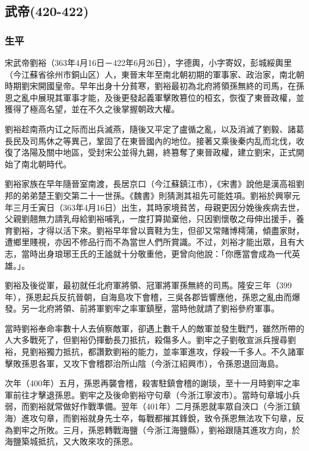 
\subsection{武帝\tiny(420-422)}

\subsubsection{生平}

宋武帝劉裕（363年4月16日－422年6月26日），字德輿，小字寄奴，彭城綏輿里（今江蘇省徐州市銅山区）人，東晉末年至南北朝初期的軍事家、政治家，南北朝時期劉宋開國皇帝。早年出身十分貧寒，劉裕最初為北府將領孫無終的司馬，在孫恩之亂中展現其軍事才能，及後更發起義軍擊敗篡位的桓玄，恢復了東晉政權，並獲得了極高名望，並在不久之後掌握朝政大權。

劉裕趁南燕内讧之际而出兵滅燕，隨後又平定了盧循之亂，以及消滅了劉毅、諸葛長民及司馬休之等異己，鞏固了在東晉國內的地位。接著又乘後秦内乱而北伐，收復了洛陽及關中地區，受封宋公並得九錫，終篡奪了東晉政權，建立劉宋，正式開始了南北朝時代。

劉裕家族在早年隨晉室南渡，長居京口（今江蘇鎮江市），《宋書》說他是漢高祖劉邦的弟弟楚王劉交第二十一世孫。《魏書》則猜測其祖先可能姓項。劉裕於興寧元年三月壬寅日（363年4月16日）出生，其時家境貧苦，母親更因分娩後疾病去世，父親劉翹無力請乳母給劉裕哺乳，一度打算拋棄他，只因劉懷敬之母伸出援手，養育劉裕，才得以活下來。劉裕早年曾以賣鞋为生，但卻又常賭博樗蒲，傾盡家財，遭鄉里賤視，亦因不修品行而不為當世人們所賞識。不过，刘裕才能出眾，且有大志，當時出身琅琊王氏的王謐就十分敬重他，更曾向他說：「你應當會成為一代英雄。」。

劉裕及後從軍，最初就任北府軍將領、冠軍將軍孫無終的司馬。隆安三年（399年），孫恩起兵反抗晉朝，自海島攻下會稽，三吳各郡皆響應他，孫恩之亂由而爆發。另一北府將領、前將軍劉牢之率軍鎮壓，當時他就請了劉裕參府軍事。

當時劉裕奉命率數十人去偵察敵軍，卻遇上數千人的敵軍並發生戰鬥，雖然所帶的人大多戰死了，但劉裕仍揮動長刀抵抗，殺傷多人。劉牢之子劉敬宣派兵搜尋劉裕，見劉裕獨力抵抗，都讚歎劉裕的能力，並率軍進攻，俘殺一千多人。不久諸軍擊敗孫恩各軍，又攻下會稽郡治所山陰（今浙江紹興市），令孫恩退回海島。

次年（400年）五月，孫恩再襲會稽，殺害駐鎮會稽的謝琰，至十一月時劉牢之率軍前往才擊退孫恩。劉牢之及後命劉裕守句章（今浙江寧波市）。當時句章城小兵弱，而劉裕就常做好作戰準備。翌年（401年）二月孫恩就率眾自浹口（今浙江鎮海）進攻句章，而劉裕就身先士卒，每戰都摧其鋒銳，致令孫恩無法攻下句章，反為劉牢之所敗。三月，孫恩轉戰海鹽（今浙江海鹽縣），劉裕跟隨其進攻方向，於海鹽築城抵抗，又大敗來攻的孫恩。

